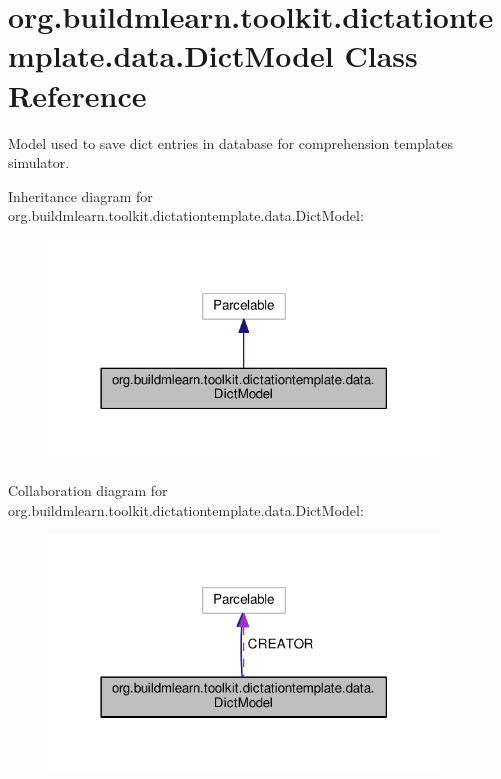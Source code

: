 \hypertarget{classorg_1_1buildmlearn_1_1toolkit_1_1dictationtemplate_1_1data_1_1DictModel}{}\section{org.\+buildmlearn.\+toolkit.\+dictationtemplate.\+data.\+Dict\+Model Class Reference}
\label{classorg_1_1buildmlearn_1_1toolkit_1_1dictationtemplate_1_1data_1_1DictModel}


Model used to save dict entries in database for comprehension template\textquotesingle{}s simulator.  




Inheritance diagram for org.\+buildmlearn.\+toolkit.\+dictationtemplate.\+data.\+Dict\+Model\+:
\nopagebreak
\begin{figure}[H]
\begin{center}
\leavevmode
\includegraphics[width=294pt]{classorg_1_1buildmlearn_1_1toolkit_1_1dictationtemplate_1_1data_1_1DictModel__inherit__graph}
\end{center}
\end{figure}


Collaboration diagram for org.\+buildmlearn.\+toolkit.\+dictationtemplate.\+data.\+Dict\+Model\+:
\nopagebreak
\begin{figure}[H]
\begin{center}
\leavevmode
\includegraphics[width=294pt]{classorg_1_1buildmlearn_1_1toolkit_1_1dictationtemplate_1_1data_1_1DictModel__coll__graph}
\end{center}
\end{figure}
